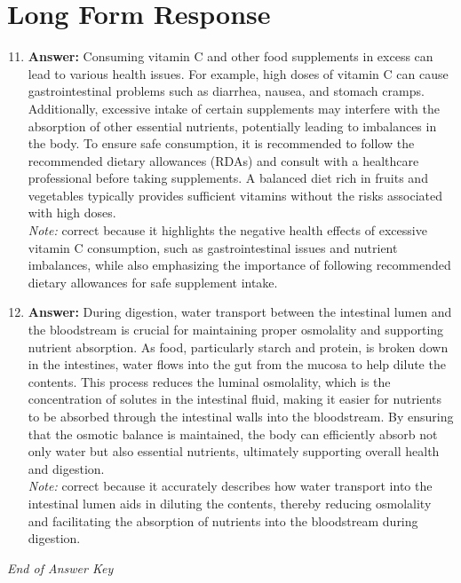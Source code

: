 \documentclass[12pt]{article}
\begin{document}
\section*{Long Form Response}
\begin{enumerate}[label=\arabic*.]
\setcounter{enumi}{10}
\item \textbf{Answer:} Consuming vitamin C and other food supplements in excess can lead to various health issues. For example, high doses of vitamin C can cause gastrointestinal problems such as diarrhea, nausea, and stomach cramps. Additionally, excessive intake of certain supplements may interfere with the absorption of other essential nutrients, potentially leading to imbalances in the body. To ensure safe consumption, it is recommended to follow the recommended dietary allowances (RDAs) and consult with a healthcare professional before taking supplements. A balanced diet rich in fruits and vegetables typically provides sufficient vitamins without the risks associated with high doses.
\\ \textit{Note:} correct because it highlights the negative health effects of excessive vitamin C consumption, such as gastrointestinal issues and nutrient imbalances, while also emphasizing the importance of following recommended dietary allowances for safe supplement intake.
\item \textbf{Answer:} During digestion, water transport between the intestinal lumen and the bloodstream is crucial for maintaining proper osmolality and supporting nutrient absorption. As food, particularly starch and protein, is broken down in the intestines, water flows into the gut from the mucosa to help dilute the contents. This process reduces the luminal osmolality, which is the concentration of solutes in the intestinal fluid, making it easier for nutrients to be absorbed through the intestinal walls into the bloodstream. By ensuring that the osmotic balance is maintained, the body can efficiently absorb not only water but also essential nutrients, ultimately supporting overall health and digestion.
\\ \textit{Note:} correct because it accurately describes how water transport into the intestinal lumen aids in diluting the contents, thereby reducing osmolality and facilitating the absorption of nutrients into the bloodstream during digestion.
\end{enumerate}

\vfill
\noindent\textit{End of Answer Key}
\end{document}
